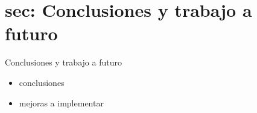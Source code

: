 \documentclass[]{beamer}
\begin{document}
\section{sec: Conclusiones y trabajo a futuro}
\begin{frame}{Conclusiones y trabajo a futuro}
    \begin{itemize}
        \item conclusiones
        \item mejoras a implementar
    \end{itemize}
\end{frame}
\end{document}
